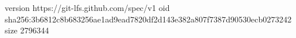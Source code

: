 version https://git-lfs.github.com/spec/v1
oid sha256:3b6812c8b683256ae1ad9ead7820df2d143e382a807f7387d90530ecb0273242
size 2796344

